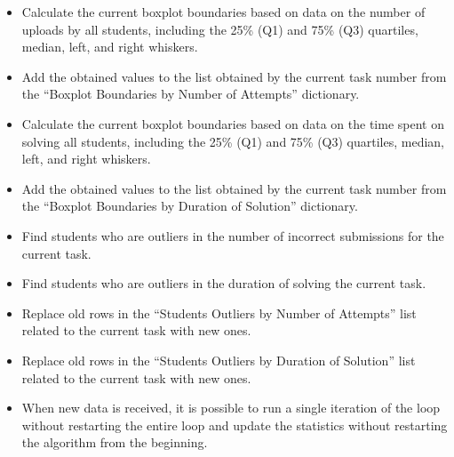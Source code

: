 \documentclass{article}
\begin{document}
\begin{multicols}{2}
\begin{justify}
\begin{enumerate}
\begin{enumerate}[leftmargin=-2pt, itemindent=37pt]
\begin{itemize}[leftmargin=30pt, itemindent=0pt]
            \item Calculate the current boxplot boundaries based on data on the number of uploads by all students, including the 25\% (Q1) and 75\% (Q3) quartiles, median, left, and right whiskers.
            \item Add the obtained values to the list obtained by the current task number from the “Boxplot Boundaries by Number of Attempts” dictionary.
            \item Calculate the current boxplot boundaries based on data on the time spent on solving all students, including the 25\% (Q1) and 75\% (Q3) quartiles, median, left, and right whiskers.
            \item Add the obtained values to the list obtained by the current task number from the “Boxplot Boundaries by Duration of Solution” dictionary.
            \item Find students who are outliers in the number of incorrect submissions for the current task.
            \item Find students who are outliers in the duration of solving the current task.
            \item Replace old rows in the “Students Outliers by Number of Attempts” list related to the current task with new ones.
            \item Replace old rows in the “Students Outliers by Duration of Solution” list related to the current task with new ones.
            \item When new data is received, it is possible to run a single iteration of the loop without restarting the entire loop and update the statistics without restarting the algorithm from the beginning.
          \end{itemize}
        \end{enumerate}
      \end{enumerate}
    \end{justify}
  \end{multicols}
\end{document}
